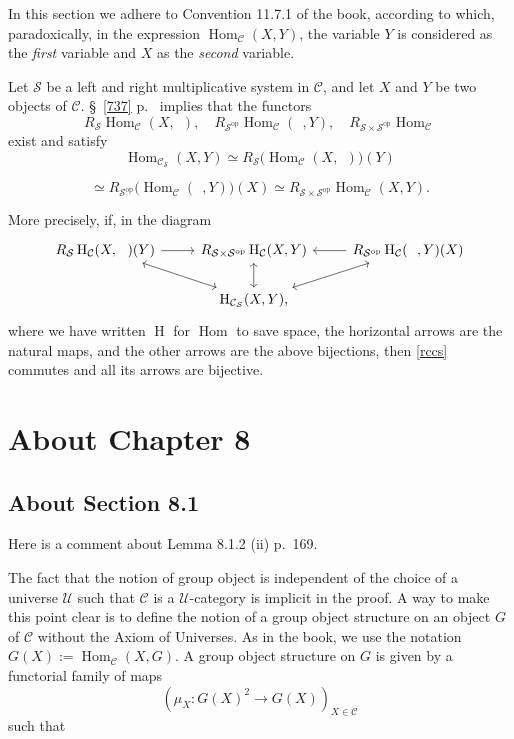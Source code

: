 \documentclass[12pt]{article}
\theoremstyle{remark}
\theoremstyle{definition}
\newcommand{\nn}{\noindent}
\newcommand{\cc}{\mathcal}
\newcommand{\oo}{\operatorname}
\newcommand{\C}{\mathcal C}
\newcommand{\U}{\mathcal U}
\DeclareMathOperator{\Hom}{Hom}
\DeclareMathOperator{\op}{op}
\begin{document}
In this section we adhere to Convention 11.7.1 of the book, according to which, paradoxically, in the expression $\Hom_\C(X,Y)$, the variable $Y$ is considered as the \emph{first} variable and $X$ as the \emph{second} variable.

Let $\cc S$ be a left and right multiplicative system in $\C$, and let $X$ and $Y$ be two objects of $\C$. \S~\ref{737} p.~\pageref{737} implies that the functors 
$$
R_{\cc S}\Hom_\C(X,\ \ ),\quad R_{{\cc S}^{\op}}\Hom_\C(\ \ ,Y),\quad R_{{\cc S}\times{\cc S}^{\op}}\Hom_\C
$$
exist and satisfy 
$$
\Hom_{\C_{\cc S}}(X,Y)\simeq R_{\cc S}\big(\Hom_\C(X,\ \ )\big)(Y)
$$

$$
\simeq R_{{\cc S}^{\op}}\big(\Hom_\C(\ \ ,Y)\big)(X)\simeq R_{{\cc S}\times{\cc S}^{\op}}\Hom_\C(X,Y).
$$

\nn More precisely, if, in the diagram 
%
\begin{equation}\label{rccs}
\begin{tikzcd}
R_{\cc S}\oo H_\C(X,\ \ )(Y)\ar[leftrightarrow]{dr}\ar{r}&R_{{\cc S}\times{\cc S}^{\op}}\oo H_\C(X,Y)\ar[leftrightarrow]{d}&R_{{\cc S}^{\op}}\oo H_\C(\ \ ,Y)(X)\ar{l}\ar[leftrightarrow]{dl}\\ 
&\oo H_{\C_{\cc S}}(X,Y),
\end{tikzcd}
\end{equation}
%
where we have written $\oo H$ for $\Hom$ to save space, the horizontal arrows are the natural maps, and the other arrows are the above bijections, then \eqref{rccs} commutes and all its arrows are bijective.


\section{About Chapter 8} 

\subsection{About Section 8.1}

Here is a comment about Lemma 8.1.2 (ii) p.~169. 

The fact that the notion of group object is independent of the choice of a universe $\U$ such that $\C$ is a $\U$-category is implicit in the proof. A way to make this point clear is to define the notion of a group object structure on an object $G$ of $\C$ without the Axiom of Universes. As in the book, we use the notation $G(X):=\Hom_\C(X,G)$. A group object structure on $G$ is given by a functorial family of maps 
$$
(\mu_X:G(X)^2\to G(X))_{X\in\C}
$$ 
such that 
\end{document}
